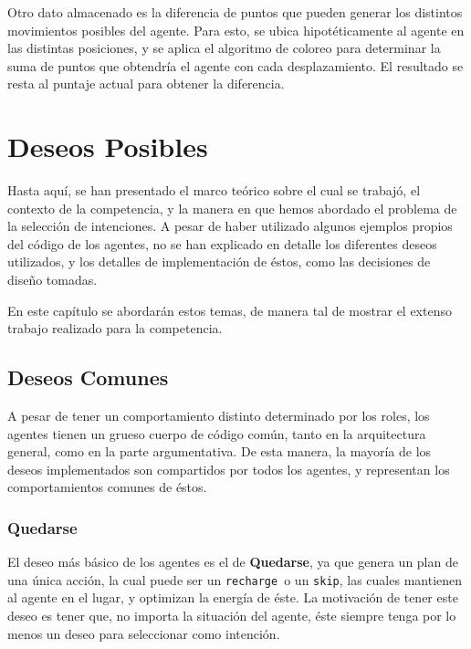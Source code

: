 \documentclass[oneside]{book}
\begin{document}
Otro dato almacenado es la diferencia de puntos que pueden generar los distintos
movimientos posibles del agente. Para esto, se ubica hipotéticamente al agente
en las distintas posiciones, y se aplica el algoritmo de coloreo para determinar
la suma de puntos que obtendría el agente con cada desplazamiento. El resultado
se resta al puntaje actual para obtener la diferencia.




\chapter{Deseos Posibles}

Hasta aquí, se han presentado el marco teórico sobre el cual se trabajó, el contexto
de la competencia, y la manera en que hemos abordado el problema de la selección de
intenciones. A pesar de haber utilizado algunos ejemplos propios del código de los 
agentes, no se han explicado en detalle los diferentes deseos utilizados, y los 
detalles de implementación de éstos, como las decisiones de diseño tomadas.

En este capítulo se abordarán estos temas, de manera tal de mostrar el extenso 
trabajo realizado para la competencia.

\section{Deseos Comunes}

A pesar de tener un comportamiento distinto determinado por los roles, los agentes
tienen un grueso cuerpo de código común, tanto en la arquitectura general, como 
en la parte argumentativa. De esta manera, la mayoría de los deseos implementados son
compartidos por todos los agentes, y representan los comportamientos comunes de éstos.

\subsection{Quedarse}

El deseo más básico de los agentes es el de \textbf{Quedarse}, ya que genera un plan de 
una única acción, la cual puede ser un \texttt{recharge}\ o un \texttt{skip}, las cuales
mantienen al agente en el lugar, y optimizan la energía de éste. La 
motivación de tener este deseo es tener que, no importa la situación del agente, éste
siempre tenga por lo menos un deseo para seleccionar como intención.
\end{document}
